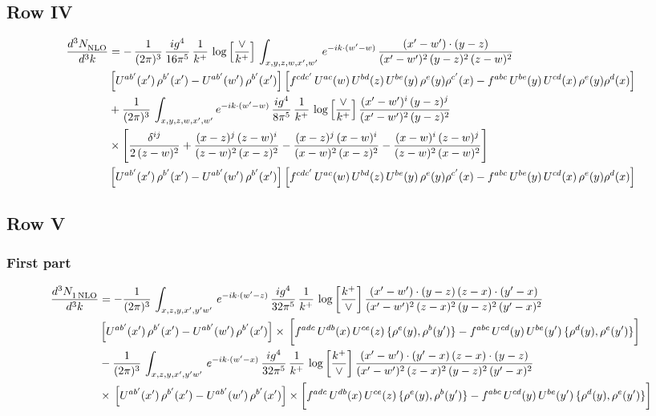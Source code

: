 \documentclass[9pt]{article}
\numberwithin{equation}{section}
\begin{document}
\subsection{Row IV}
\begin{align}
    \frac{d^{3}N_{\rm NLO}^{\rm}}{d^{3}k}  & = -\, \frac{1}{(2\pi)^{3}}\,\frac{ig^{4}}{16\pi^{5}}\,\frac{1}{k^{+}}\,\log{\left[\frac{\vee}{k^{+}}\right]}\,
    \int_{x,y,z,w,x',w'}\,e^{-ik\cdot (w^\prime-w)}\, \frac{(x'-w')\cdot (y-z)}{(x'-w')^{2}\,(y-z)^{2}\,(z-w)^{2}}\notag \\ &   \left[U^{ab'}(x')\,\rho^{b'}(x')-U^{ab'}(w')\,\rho^{b'}(x')\right] \left[f^{cdc'}\,U^{ac}(w)\,U^{bd}(z)\,U^{be}(y)\,\rho^{e}(y)\rho^{c'}(x)-f^{abc}\,U^{be}(y)\,U^{cd}(x)\,\rho^{e}(y)\rho^{d}(x)\right]
\notag \\ & +\frac{1}{(2\pi)^{3}}\,\int_{x,y,z,w,x',w'}e^{-ik\cdot (w^\prime-w)}\,\frac{ig^{4}}{8\pi^{5}}\,\frac{1}{k^{+}}\,\log{\left[\frac{\vee}{k^{+}}\right]}\,\frac{(x'-w')^{i}\,(y-z)^{j}}{(x'-w')^{2}\,(y-z)^{2}}\notag \\ & \times \Bigg[\frac{\delta^{ij}}{2\,(z-w)^{2}}+\frac{(x-z)^{j}\,(z-w)^{i}}{(z-w)^{2}\,(x-z)^{2}}-\frac{(x-z)^{j}\,(x-w)^{i}}{(x-w)^{2}\,(x-z)^{2}}-\frac{(x-w)^{i}\,(z-w)^{j}}{(z-w)^{2}\,(x-w)^{2}}\Bigg]\notag \\ & \left[U^{ab'}(x')\,\rho^{b'}(x')-U^{ab'}(w')\,\rho^{b'}(x')\right] \left[f^{cdc'}\,U^{ac}(w)\,U^{bd}(z)\,U^{be}(y)\,\rho^{e}(y)\rho^{c'}(x)-f^{abc}\,U^{be}(y)\,U^{cd}(x)\,\rho^{e}(y)\rho^{d}(x)\right]
\end{align}
\subsection{Row V}
\subsubsection*{First part}
\begin{align}
     \frac{d^{3}N_{1\,\rm NLO}^{\rm}}{d^{3}k}  & = -\frac{1}{(2\pi)^{3}}\, \int_{x,z,y,x',y'w'}\,e^{-ik\cdot (w^\prime-z)}\,\frac{ig^{4}}{32\pi^{5}}\, \frac{1}{k^{+}}\,\log{\left[\frac{k^{+}}{\vee}\right]}\,\frac{(x'-w')\cdot (y-z)\,(z-x)\cdot (y'-x)}{(x'-w')^{2}\,(z-x)^{2}\,(y-z)^{2}\,(y'-x)^{2}}\,\notag \\ & \left[U^{ab'}(x')\,\rho^{b'}(x')-U^{ab'}(w')\,\rho^{b'}(x')\right]\times\, \bigg[f^{adc}\,U^{db}(x)\,U^{ce}(z)\, \{\rho^{e}(y),\rho^{b}(y')\}-f^{abc}\,U^{cd}(y)\,U^{be}(y')\, \{\rho^{d}(y),\rho^{e}(y')\}\bigg]\notag \\ &  -\frac{1}{(2\pi)^{3}}\, \int_{x,z,y,x',y'w'}\,e^{-ik\cdot (w^\prime-x)}\,\frac{ig^{4}}{32\pi^{5}}\, \frac{1}{k^{+}}\, \log{\left[\frac{k^{+}}{\vee}\right]}\,\frac{(x'-w')\cdot (y'-x)\,(z-x)\cdot (y-z)}{(x'-w')^{2}\,(z-x)^{2}\,(y-z)^{2}\,(y'-x)^{2}}\notag \\ & \times\, \left[U^{ab'}(x')\,\rho^{b'}(x')-U^{ab'}(w')\,\rho^{b'}(x')\right]\times \bigg[f^{adc}\,U^{db}(x)\,U^{ce}(z)\, \{\rho^{e}(y),\rho^{b}(y')\}-f^{abc}\,U^{cd}(y)\,U^{be}(y')\, \{\rho^{d}(y),\rho^{e}(y')\}\bigg]
\end{align}
\end{document}
